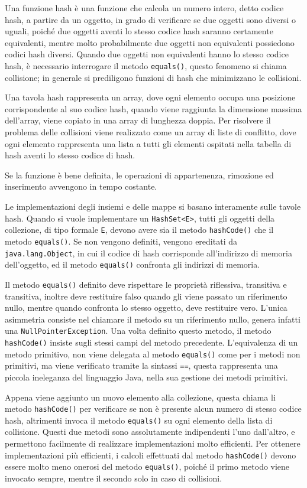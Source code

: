 \documentclass{article}
\numberwithin{equation}{subsection}
\begin{document}
Una funzione hash è una funzione che calcola un numero intero, detto codice hash, a partire da un oggetto, in grado di verificare se due oggetti sono diversi o uguali, 
poiché due oggetti aventi lo stesso codice hash saranno certamente equivalenti, mentre molto probabilmente due oggetti non equivalenti possiedono codici hash diversi. 
Quando due oggetti non equivalenti hanno lo stesso codice hash, è necessario interrogare il metodo \verb|equals()|, questo fenomeno si chiama collisione; in generale 
si prediligono funzioni di hash che minimizzano le collisioni. 

Una tavola hash rappresenta un array, dove ogni elemento occupa una posizione corrispondente al suo codice hash, quando viene raggiunta la dimensione massima dell'array, 
viene copiato in una array di lunghezza doppia. 
Per risolvere il problema delle collisioni viene realizzato come un array di liste di conflitto, dove ogni elemento rappresenta una lista a tutti gli elementi ospitati 
nella tabella di hash aventi lo stesso codice di hash. 

Se la funzione è bene definita, le operazioni di appartenenza, rimozione ed inserimento avvengono in tempo costante. 

Le implementazioni degli insiemi e delle mappe si basano interamente sulle tavole hash. 
Quando si vuole implementare un \verb|HashSet<E>|, tutti gli oggetti della collezione, di tipo formale \verb|E|, devono avere sia il metodo \verb|hashCode()| che il metodo 
\verb|equals()|. 
Se non vengono definiti, vengono ereditati da \verb|java.lang.Object|, in cui il codice di hash corrisponde all'indirizzo di memoria dell'oggetto, ed il metodo \verb|equals()| 
confronta gli indirizzi di memoria. 

Il metodo \verb|equals()| definito deve rispettare le proprietà riflessiva, transitiva e transitiva, inoltre deve restituire falso quando gli viene passato un riferimento nullo, 
mentre quando confronta lo stesso oggetto, deve restituire vero. L'unica asimmetria consiste nel chiamare il metodo su un riferimento nullo, genera infatti una 
\verb|NullPointerException|. Una volta definito questo metodo, il metodo \verb|hashCode()| insiste sugli stessi campi del metodo precedente. 
L'equivalenza di un metodo primitivo, non viene delegata al metodo \verb|equals()| come per i metodi non primitivi, ma viene verificato tramite la sintassi \verb|==|, questa 
rappresenta una piccola ineleganza del linguaggio Java, nella sua gestione dei metodi primitivi. 

Appena viene aggiunto un nuovo elemento alla collezione, questa chiama li metodo \verb|hashCode()| per verificare se non è presente alcun numero di stesso codice hash, 
altrimenti invoca il metodo \verb|equals()| su ogni elemento della lista di collisione. 
Questi due metodi sono assolutamente indipendenti l'uno dall'altro, e permettono facilmente di realizzare implementazioni molto efficienti. 
Per ottenere implementazioni più efficienti, i calcoli effettuati dal metodo \verb|hashCode()| devono essere molto meno onerosi del metodo \verb|equals()|, poiché il primo 
metodo viene invocato sempre, mentre il secondo solo in caso di collisioni. 
\end{document}
